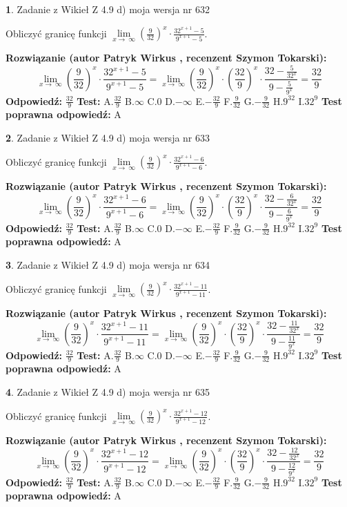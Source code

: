 \documentclass[12pt, a4paper]{article}
\theoremstyle{definition} %
\newtheorem{zad}{}
\newcommand{\zadStart}[1]{\begin{zad}#1\newline}
\newcommand{\zadStop}{\end{zad}}
\newcommand{\rozwStart}[2]{\noindent \textbf{Rozwiązanie (autor #1 , recenzent #2): }\newline}
\newcommand{\rozwStop}{\newline}
\newcommand{\odpStart}{\noindent \textbf{Odpowiedź:}\newline}
\newcommand{\odpStop}{\newline}
\newcommand{\testStart}{\noindent \textbf{Test:}\newline}
\newcommand{\testStop}{\newline}
\newcommand{\kluczStart}{\noindent \textbf{Test poprawna odpowiedź:}\newline}
\newcommand{\kluczStop}{\newline}
\begin{document}
\zadStart{Zadanie z Wikieł Z 4.9 d) moja wersja nr 632}


Obliczyć granicę funkcji  $\lim\limits_{x\to\ \infty}(\frac{9}{32})^{x}\cdot\frac{32^{x+1}-5}{9^{x+1}-5}$.
\zadStop
\rozwStart{Patryk Wirkus}{Szymon Tokarski}
$$\lim\limits_{x\to\ \infty}(\frac{9}{32})^{x}\cdot\frac{32^{x+1}-5}{9^{x+1}-5}=\lim\limits_{x\to\ \infty}(\frac{9}{32})^{x}\cdot(\frac{32}{9})^{x} \cdot \frac{32-\frac{5}{32^{x}}}{9-\frac{5}{9^{x}}} = \frac{32}{9}$$
\rozwStop
\odpStart
$\frac{32}{9}$
\odpStop
\testStart
A.$\frac{32}{9}$ B.$\infty$ C.$0$ D.$-\infty$ E.$-\frac{32}{9}$
F.$\frac{9}{32}$ G.$-\frac{9}{32}$
H.$9^{32}$
I.$32^{9}$
\testStop
\kluczStart
A
\kluczStop



\zadStart{Zadanie z Wikieł Z 4.9 d) moja wersja nr 633}


Obliczyć granicę funkcji  $\lim\limits_{x\to\ \infty}(\frac{9}{32})^{x}\cdot\frac{32^{x+1}-6}{9^{x+1}-6}$.
\zadStop
\rozwStart{Patryk Wirkus}{Szymon Tokarski}
$$\lim\limits_{x\to\ \infty}(\frac{9}{32})^{x}\cdot\frac{32^{x+1}-6}{9^{x+1}-6}=\lim\limits_{x\to\ \infty}(\frac{9}{32})^{x}\cdot(\frac{32}{9})^{x} \cdot \frac{32-\frac{6}{32^{x}}}{9-\frac{6}{9^{x}}} = \frac{32}{9}$$
\rozwStop
\odpStart
$\frac{32}{9}$
\odpStop
\testStart
A.$\frac{32}{9}$ B.$\infty$ C.$0$ D.$-\infty$ E.$-\frac{32}{9}$
F.$\frac{9}{32}$ G.$-\frac{9}{32}$
H.$9^{32}$
I.$32^{9}$
\testStop
\kluczStart
A
\kluczStop



\zadStart{Zadanie z Wikieł Z 4.9 d) moja wersja nr 634}


Obliczyć granicę funkcji  $\lim\limits_{x\to\ \infty}(\frac{9}{32})^{x}\cdot\frac{32^{x+1}-11}{9^{x+1}-11}$.
\zadStop
\rozwStart{Patryk Wirkus}{Szymon Tokarski}
$$\lim\limits_{x\to\ \infty}(\frac{9}{32})^{x}\cdot\frac{32^{x+1}-11}{9^{x+1}-11}=\lim\limits_{x\to\ \infty}(\frac{9}{32})^{x}\cdot(\frac{32}{9})^{x} \cdot \frac{32-\frac{11}{32^{x}}}{9-\frac{11}{9^{x}}} = \frac{32}{9}$$
\rozwStop
\odpStart
$\frac{32}{9}$
\odpStop
\testStart
A.$\frac{32}{9}$ B.$\infty$ C.$0$ D.$-\infty$ E.$-\frac{32}{9}$
F.$\frac{9}{32}$ G.$-\frac{9}{32}$
H.$9^{32}$
I.$32^{9}$
\testStop
\kluczStart
A
\kluczStop



\zadStart{Zadanie z Wikieł Z 4.9 d) moja wersja nr 635}


Obliczyć granicę funkcji  $\lim\limits_{x\to\ \infty}(\frac{9}{32})^{x}\cdot\frac{32^{x+1}-12}{9^{x+1}-12}$.
\zadStop
\rozwStart{Patryk Wirkus}{Szymon Tokarski}
$$\lim\limits_{x\to\ \infty}(\frac{9}{32})^{x}\cdot\frac{32^{x+1}-12}{9^{x+1}-12}=\lim\limits_{x\to\ \infty}(\frac{9}{32})^{x}\cdot(\frac{32}{9})^{x} \cdot \frac{32-\frac{12}{32^{x}}}{9-\frac{12}{9^{x}}} = \frac{32}{9}$$
\rozwStop
\odpStart
$\frac{32}{9}$
\odpStop
\testStart
A.$\frac{32}{9}$ B.$\infty$ C.$0$ D.$-\infty$ E.$-\frac{32}{9}$
F.$\frac{9}{32}$ G.$-\frac{9}{32}$
H.$9^{32}$
I.$32^{9}$
\testStop
\kluczStart
A
\kluczStop
\end{document}
